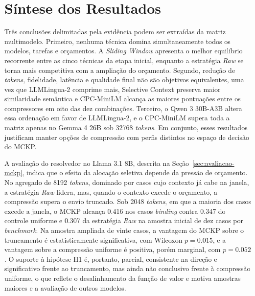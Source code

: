\section{Síntese dos Resultados}
\label{sec:sintese-resultados}

Três conclusões delimitadas pela evidência podem ser extraídas da matriz multimodelo. Primeiro, nenhuma técnica domina simultaneamente todos os modelos, tarefas e orçamentos. A \textit{Sliding Window} apresenta o melhor equilíbrio recorrente entre as cinco técnicas da etapa inicial, enquanto a estratégia \textit{Raw} se torna mais competitiva com a ampliação do orçamento. Segundo, redução de \textit{tokens}, fidelidade, latência e qualidade final não são objetivos equivalentes, uma vez que LLMLingua-2 comprime mais, Selective Context preserva maior similaridade semântica e CPC-MiniLM alcança as maiores pontuações entre os compressores em oito das dez combinações. Terceiro, o Qwen 3 30B-A3B altera essa ordenação em favor de LLMLingua-2, e o CPC-MiniLM supera toda a matriz apenas no Gemma 4 26B sob 32768 \textit{tokens}. Em conjunto, esses resultados justificam manter opções de compressão com perfis distintos no espaço de decisão do MCKP.

A avaliação do resolvedor no Llama 3.1 8B, descrita na Seção~\ref{sec:avaliacao-mckp}, indica que o efeito da alocação seletiva depende da pressão de orçamento. No agregado de 8192 \textit{tokens}, dominado por casos cujo contexto já cabe na janela, a estratégia \textit{Raw} lidera, mas, quando o contexto excede o orçamento, a compressão supera o envio truncado. Sob 2048 \textit{tokens}, em que a maioria dos casos excede a janela, o MCKP alcança 0.416 nos casos \textit{binding} contra 0.347 do controle uniforme e 0.307 da estratégia \textit{Raw} na amostra inicial de dez casos por \textit{benchmark}. Na amostra ampliada de vinte casos, a vantagem do MCKP sobre o truncamento é estatisticamente significativa, com Wilcoxon $p = 0.015$, e a vantagem sobre a compressão uniforme é positiva, porém marginal, com $p = 0.052$. O suporte à hipótese H1 é, portanto, parcial, consistente na direção e significativo frente ao truncamento, mas ainda não conclusivo frente à compressão uniforme, o que reflete o desalinhamento da função de valor e motiva amostras maiores e a avaliação de outros modelos.
